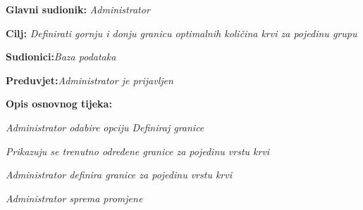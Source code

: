 \noindent {}
\begin{packed_item}
	
	\item \textbf{Glavni sudionik: }\textit{Administrator}\eject
	\item  \textbf{Cilj:} \textit{Definirati gornju i donju granicu optimalnih količina krvi za pojedinu grupu}\eject
	\item  \textbf{Sudionici:}\textit{Baza podataka}\eject 
	\item  \textbf{Preduvjet:}\textit{Administrator je prijavljen}\eject
	\item  \textbf{Opis osnovnog tijeka:}
	
	\item[] \begin{packed_enum}
		
		\item \textit{Administrator odabire opciju Definiraj granice}\eject
		\item \textit{Prikazuju se trenutno određene granice za pojedinu vrstu krvi}\eject 
		\item \textit{Administrator definira granice za pojedinu vrstu krvi}\eject 
		\item \textit{Administrator sprema promjene}\eject
		
	\end{packed_enum}
\end{packed_item}

